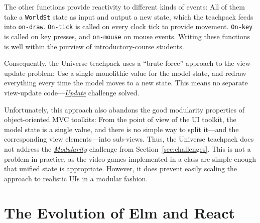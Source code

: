 \documentclass[sigplan,screen]{acmart}
\begin{document}
The other functions provide reactivity to different kinds of events:
All of them take a \texttt{WorldSt} state as input and output a new
state, which the teachpack feeds into \texttt{on-draw}.
\texttt{On-tick} is called on every clock tick to provide movement.
\texttt{On-key} is called on
key presses, and \texttt{on-mouse} on mouse events.  Writing these
functions is well within the purview of introductory-course students.

Consequently, the Universe teachpack uses a ``brute-force'' approach
to the view-update problem: Use a single monolithic value for the model
state, and redraw everything every time the model moves to a new
state.  This means no separate view-update code---\hyperlink{challenge:update}{\textit{Update}} challenge
solved.

Unfortunately, this approach also abandons the good modularity
properties of object-oriented MVC toolkits: From the point of view of
the UI toolkit, the model state is a single value, and there is no
simple way to split it---and the corresponding view elements---into
sub-views.  Thus, the Universe
teachpack does not address the \hyperlink{challenge:modularity}{\textit{Modularity}} challenge from
Section~\ref{sec:challenges}.  This is not a
problem in practice, as the video games implemented in
a class are simple enough that unified state is appropriate.  However,
it does prevent easily scaling the approach to realistic UIs in a
modular fashion.

\section{The Evolution of Elm and React}
\label{sec:elm-react}
\end{document}
